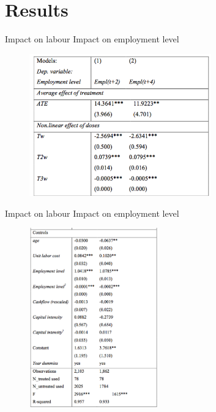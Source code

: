 \documentclass[10pt,handout,xcolor=pdftex,dvipsnames,table]{beamer}
\begin{document}
\section{Results}
\begin{frame}{Impact on labour}
Impact on employment level
\begin{figure}[t]
\centering
\includegraphics[width=0.7\textwidth]{./Figs/T1.png}
\end{figure}
\end{frame}
\begin{frame}{Impact on labour}
Impact on employment level
\begin{figure}[t]
\centering
\includegraphics[width=0.5\textwidth]{./Figs/T2.png}
\end{figure}
\end{frame}
\end{document}
